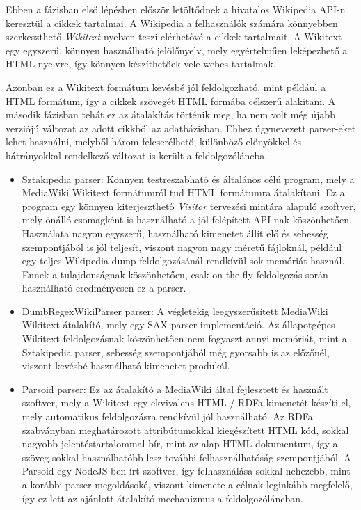 Ebben a fázisban első lépésben először letöltődnek a hivatalos Wikipedia API-n keresztül a cikkek tartalmai. A Wikipedia a felhasználók számára könnyebben szerkeszthető \textit{Wikitext} nyelven teszi elérhetővé a cikkek tartalmait. A Wikitext egy egyszerű, könnyen használható jelölőnyelv, mely egyértelműen leképezhető a HTML nyelvre, így könnyen készíthetőek vele webes tartalmak.

Azonban ez a Wikitext formátum kevésbé jól feldolgozható, mint például a HTML formátum, így a cikkek szövegét HTML formába célszerű alakítani. A második fázisban tehát ez az átalakítás történik meg, ha nem volt még újabb verziójú változat az adott cikkből az adatbázisban. Ehhez úgynevezett parser-eket lehet használni, melyből három felcserélhető, különböző előnyökkel és hátrányokkal rendelkező változat is került a feldolgozóláncba.

\begin{itemize}
	\item Sztakipedia parser: Könnyen testreszabható és általános célú program, mely a MediaWiki Wikitext formátumról tud HTML formátumra átalakítani. Ez a program egy könnyen kiterjeszthető \textit{Visitor} tervezési mintára alapuló szoftver, mely önálló csomagként is használható a jól felépített API-nak köszönhetően. Használata nagyon egyszerű, használható kimenetet állít elő és sebesség szempontjából is jól teljesít, viszont nagyon nagy méretű fájloknál, például egy teljes Wikipedia dump feldolgozásánál rendkívül sok memóriát használ. Ennek a tulajdonságnak köszönhetően, csak on-the-fly feldolgozás során használható eredményesen ez a parser.
	
	\item DumbRegexWikiParser parser: A végletekig leegyszerűsített MediaWiki Wikitext átalakító, mely egy SAX parser implementáció. Az állapotgépes Wikitext feldolgozásnak köszönhetően nem fogyaszt annyi memóriát, mint a Sztakipedia parser, sebesség szempontjából még gyorsabb is az előzőnél, viszont kevésbé használható kimenetet produkál.
	
	\item Parsoid parser: Ez az átalakító a MediaWiki által fejlesztett és használt szoftver, mely a Wikitext egy ekvivalens HTML / RDFa kimenetét készíti el, mely automatikus feldolgozásra rendkívül jól használható. Az RDFa szabványban meghatározott attribútumokkal kiegészített HTML kód, sokkal nagyobb jelentéstartalommal bír, mint az alap HTML dokumentum, így a szöveg sokkal használhatóbb lesz további felhasználhatóság szempontjából. A Parsoid egy NodeJS-ben írt szoftver, így felhasználása sokkal nehezebb, mint a korábbi parser megoldásoké, viszont kimenete a célnak leginkább megfelelő, így ez lett az ajánlott átalakító mechanizmus a feldolgozóláncban.
\end{itemize}

